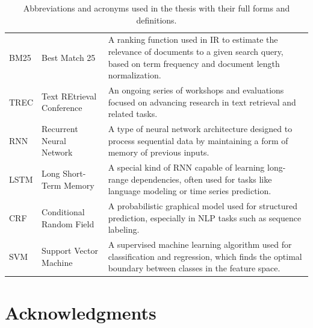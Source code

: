 \documentclass[a4paper,12pt, openany]{book}  %
\begin{document}
\begin{appendices}
\begin{table}[H]
\begin{tabularx}{\textwidth}{ l l >{\justifying\arraybackslash}X }
\cmidrule(lr){1-2}
BM25  & Best Match 25 & A ranking function used in IR to estimate the relevance of documents to a given search query, based on term frequency and document length normalization. \\
\cmidrule(lr){1-2}
TREC  & Text REtrieval Conference & An ongoing series of workshops and evaluations focused on advancing research in text retrieval and related tasks. \\
\cmidrule(lr){1-2}
RNN   & Recurrent Neural Network & A type of neural network architecture designed to process sequential data by maintaining a form of memory of previous inputs. \\
\cmidrule(lr){1-2}
LSTM  & Long Short-Term Memory & A special kind of RNN capable of learning long-range dependencies, often used for tasks like language modeling or time series prediction. \\
\cmidrule(lr){1-2}
CRF   & Conditional Random Field & A probabilistic graphical model used for structured prediction, especially in NLP tasks such as sequence labeling. \\
\cmidrule(lr){1-2}
SVM   & Support Vector Machine & A supervised machine learning algorithm used for classification and regression, which finds the optimal boundary between classes in the feature space. \\
\bottomrule
\end{tabularx}
\caption{Abbreviations and acronyms used in the thesis with their full forms and definitions.}
\label{tab:abbreviations}
\end{table}


\end{appendices}


\chapter*{Acknowledgments}

\backmatter
\pagestyle{fancy}
\cleardoublepage
{}
{}
\printbibliography
\end{document}
